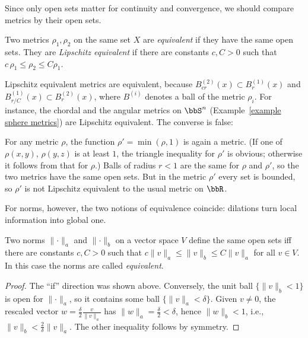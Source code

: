 Since only open sets matter for continuity and convergence, we should compare metrics by their open sets.

\begin{defn}
    Two metrics $\rho_1,\rho_2$ on the same set $X$ are \emph{equivalent} if they have the same open sets. They are \emph{Lipschitz equivalent} if there are constants $c,C>0$ such that $c\,\rho_1\leq\rho_2\leq C\rho_1$.
\end{defn}

Lipschitz equivalent metrics are equivalent, because $B^{(2)}_{cr}(x)\subset B^{(1)}_r(x)$ and $B^{(1)}_{r/C}(x)\subset B^{(2)}_r(x)$, where $B^{(i)}$ denotes a ball of the metric $\rho_i$. For instance, the chordal and the angular metrics on $\bbS^n$ (Example~\ref{example sphere metrics}) are Lipschitz equivalent. The converse is false:

\begin{example}\label{example bounded metric}
    For any metric $\rho$, the function $\rho'=\min(\rho,1)$ is again a metric. (If one of $\rho(x,y)$, $\rho(y,z)$ is at least $1$, the triangle inequality for $\rho'$ is obvious; otherwise it follows from that for $\rho$.) Balls of radius $r<1$ are the same for $\rho$ and $\rho'$, so the two metrics have the same open sets. But in the metric $\rho'$ every set is bounded, so $\rho'$ is not Lipschitz equivalent to the usual metric on $\bbR$.
\end{example}

For norms, however, the two notions of equivalence coincide: dilations turn local information into global one.

\begin{prop}\label{prop equivalent norms}
    Two norms $\lVert\cdot\rVert_a$ and $\lVert\cdot\rVert_b$ on a vector space $V$ define the same open sets iff there are constants $c,C>0$ such that $c\lVert v\rVert_a\leq\lVert v\rVert_b\leq C\lVert v\rVert_a$ for all $v\in V$. In this case the norms are called \emph{equivalent}.
\end{prop}
\begin{proof}
    The ``if'' direction was shown above. Conversely, the unit ball $\{\lVert v\rVert_b<1\}$ is open for $\lVert\cdot\rVert_a$, so it contains some ball $\{\lVert v\rVert_a<\delta\}$. Given $v\neq0$, the rescaled vector $w=\frac{\delta}{2}\frac{v}{\lVert v\rVert_a}$ has $\lVert w\rVert_a=\frac\delta2<\delta$, hence $\lVert w\rVert_b<1$, i.e., $\lVert v\rVert_b<\frac2\delta\lVert v\rVert_a$. The other inequality follows by symmetry.
\end{proof}

